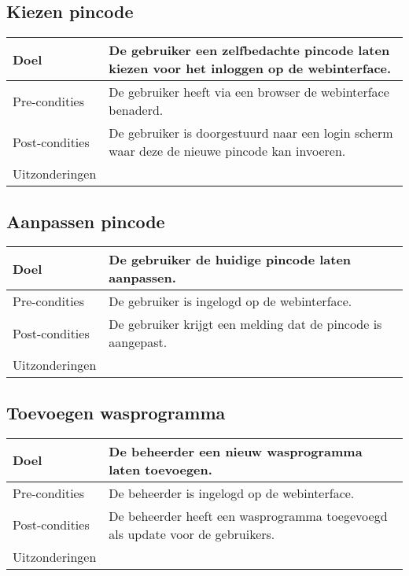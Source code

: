 \subsection{Kiezen pincode}
\begin{center}
  \begin{tabular}{ | p{4cm} | p{8.5cm} | }    \hline
    Doel & De gebruiker een zelfbedachte pincode laten kiezen voor het inloggen op de webinterface. \\ \hline
    Pre-condities & De gebruiker heeft via een browser de webinterface benaderd. \\ \hline
    Post-condities & De gebruiker is doorgestuurd naar een login scherm waar deze de nieuwe pincode kan invoeren. \\ \hline
    Uitzonderingen &  \\
    \hline
  \end{tabular}
\end{center}

\subsection{Aanpassen pincode}
\begin{center}
  \begin{tabular}{ | p{4cm} | p{8.5cm} | }    \hline
    Doel & De gebruiker de huidige pincode laten aanpassen. \\ \hline
    Pre-condities & De gebruiker is ingelogd op de webinterface. \\ \hline
    Post-condities & De gebruiker krijgt een melding dat de pincode is aangepast. \\ \hline
	Uitzonderingen &  \\
    \hline
  \end{tabular}
\end{center}

\subsection{Toevoegen wasprogramma}
\begin{center}
  \begin{tabular}{ | p{4cm} | p{8.5cm} | }    \hline
    Doel & De beheerder een nieuw wasprogramma laten toevoegen. \\ \hline
    Pre-condities & De beheerder is ingelogd op de webinterface. \\ \hline
    Post-condities & De beheerder heeft een wasprogramma toegevoegd als update voor de gebruikers. \\ \hline
	Uitzonderingen &  \\
    \hline
  \end{tabular}
\end{center}